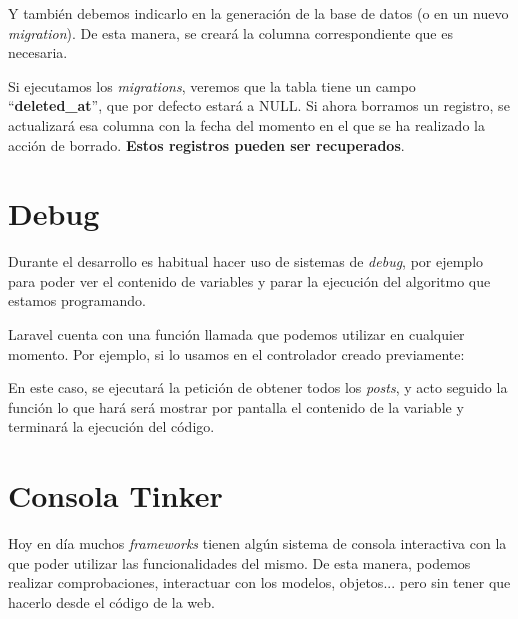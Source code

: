 Y también debemos indicarlo en la generación de la base de datos (o en un nuevo \textit{migration}). De esta manera, se creará la columna correspondiente que es necesaria.


Si ejecutamos los \textit{migrations}, veremos que la tabla tiene un campo “\textbf{deleted\_at}”, que por defecto estará a NULL. Si ahora borramos un registro, se actualizará esa columna con la fecha del momento en el que se ha realizado la acción de borrado. \textbf{Estos registros pueden ser recuperados}.



\chapter{Debug}
Durante el desarrollo es habitual hacer uso de sistemas de \textit{debug}, por ejemplo para poder ver el contenido de variables y parar la ejecución del algoritmo que estamos programando.

Laravel cuenta con una función llamada  que podemos utilizar en cualquier momento. Por ejemplo, si lo usamos en el controlador creado previamente:


En este caso, se ejecutará la petición de obtener todos los \textit{posts}, y acto seguido la función  lo que hará será mostrar por pantalla el contenido de la variable y terminará la ejecución del código.


\chapter{Consola Tinker}

Hoy en día muchos \textit{frameworks} tienen algún sistema de consola interactiva con la que poder utilizar las funcionalidades del mismo. De esta manera, podemos realizar comprobaciones, interactuar con los modelos, objetos... pero sin tener que hacerlo desde el código de la web.

